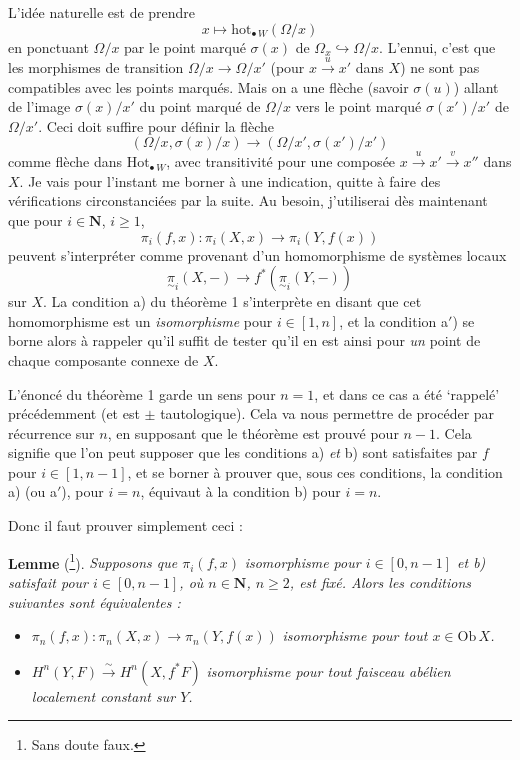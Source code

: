 \documentclass[11pt]{article}
\newcommand{\printedpage}[1]{{\reversemarginpar\marginnote{\raggedleft\scriptsize ed.~#1}}}
\newcommand{\msp}[1]{\marginpar{\raggedright\scriptsize ms.~#1}}
\newcommand{\Hotp}[1]{\mathrm{Hot}_{\bullet\,#1}}
\newcommand{\hotp}[1]{\mathrm{hot}_{\bullet\,#1}}
\newcommand{\Ob}{\mathrm{Ob}\,}
\newcommand{\utpi}{\underset{\sim}{\pi}}
\begin{document}
L'idée naturelle est de prendre
\[
x \longmapsto \hotp{W}(\Omega/x)
\]
en ponctuant $\Omega/x$ par le point marqué $\sigma(x)$ de $\Omega_x \hookrightarrow \Omega/x$. L'ennui, c'est que les morphismes de transition $\Omega/x \longrightarrow \Omega/x'$ (pour $x \xrightarrow{u} x'$ dans $X$) ne sont pas compatibles avec les points marqués. Mais on a une flèche (savoir $\sigma(u)$) allant
\msp{page 175}
de l'image $\sigma(x)/x'$ du point marqué de $\Omega/x$ vers le point marqué $\sigma(x')/x'$ de $\Omega/x'$. Ceci doit suffire pour définir la flèche
\[
(\Omega/x,\sigma(x)/x) \longrightarrow (\Omega/x',\sigma(x')/x')
\]
comme flèche dans $\Hotp{W}$, avec transitivité pour une composée $x \xrightarrow{u} x' \xrightarrow{v} x''$ dans $X$. Je vais pour l'instant me borner
\printedpage{118}
\msp{page 176}
à une indication, quitte à faire des vérifications circonstanciées par la suite. Au besoin, j'utiliserai dès maintenant que pour $i \in \mathbf{N}$, $i \geq 1$,
\[
\pi_i(f,x) : \pi_i(X,x) \longrightarrow \pi_i(Y,f(x))
\]
peuvent s'interpréter comme provenant d'un homomorphisme de systèmes locaux
\[
\utpi_i(X,-) \longrightarrow f^*(\utpi_i(Y,-))
\]
sur $X$. La condition a) du théorème 1 s'interprète en disant que cet homomorphisme est un \textit{isomorphisme} pour $i \in [1,n]$, et la condition a$'$) se borne alors à rappeler qu'il suffit de tester qu'il en est ainsi pour \textit{un} point de chaque composante connexe de $X$.

L'énoncé du théorème 1 garde un sens pour $n = 1$, et dans ce cas a été `rappelé' précédemment (et est $\pm$ tautologique). Cela va nous permettre de procéder par récurrence sur $n$, en supposant que le théorème est prouvé pour $n-1$. Cela signifie que l'on peut supposer que les conditions a) \textit{et} b) sont satisfaites par $f$ pour $i \in [1,n-1]$, et se borner à prouver que, sous ces conditions, la condition a) (ou a$'$), pour $i = n$, équivaut à la condition b) pour $i = n$.

\msp{page 177}

Donc il faut prouver simplement ceci :

\textbf{Lemme} (\footnote[115]{Sans doute faux.}). \textit{Supposons que $\pi_i(f,x)$} \textit{isomorphisme pour $i \in [0,n-1]$ et b) satisfait pour $i \in [0,n-1]$, où $n \in \mathbf{N}$, $n \geq 2$, est fixé. Alors les conditions suivantes sont équivalentes :}

\begin{itemize}
\item[\textit{a)}] $\pi_n(f,x) : \pi_n(X,x) \longrightarrow \pi_n(Y,f(x))$ \textit{isomorphisme pour tout $x \in \Ob X$.}

\item[\textit{b)}] $H^n(Y,F) \xrightarrow{\sim} H^n(X,f^*F)$ \textit{isomorphisme pour tout faisceau abélien localement constant sur $Y$.}
\end{itemize}
\end{document}
